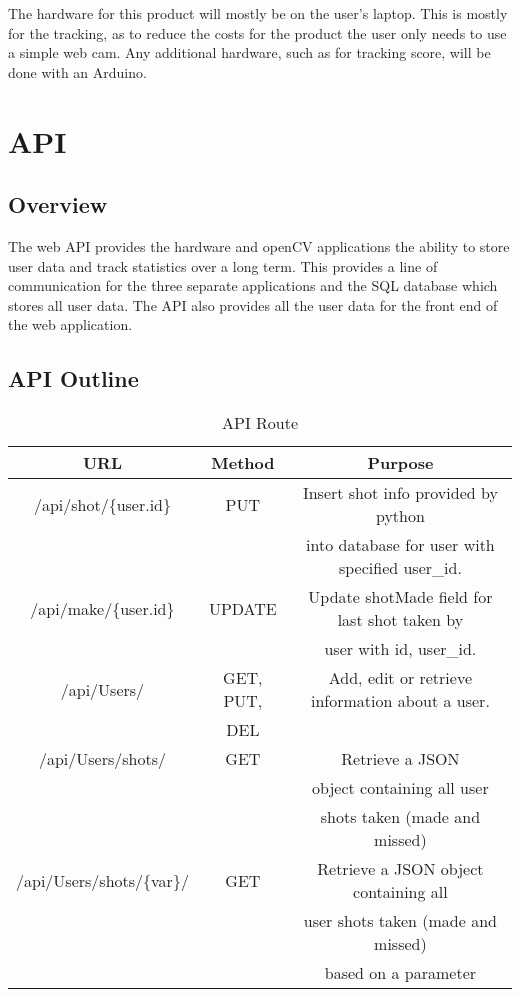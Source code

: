 The hardware for this product will mostly be on the user's laptop. This is mostly for the tracking, as to reduce the costs for the product the user only needs to use a simple web cam. Any additional hardware, such as for tracking score, will be done with an Arduino.


\section{API}
\subsection{Overview}
The web API provides the hardware and openCV applications the ability to store user data and track statistics over a long term. This provides a line of communication for the three separate applications and the SQL database which stores all user data. The API also provides all the user data for the front end of the web application.
\subsection{API Outline}
\begin{table}[h!]
  \centering
  \caption{API Route}
  \label{tab:table9}
  \begin{tabular}{ccc}
    \toprule
    URL & Method & Purpose\\
    \midrule
    /api/shot/\{user.id\} & PUT & Insert shot info provided by python \\
    & & into database for user with specified user_id. \\ 
    
    /api/make/\{user.id\} & UPDATE & Update shotMade field for last shot taken by\\ 
    & & user with id, user_id. \\
    
    /api/Users/ & GET, PUT, & Add, edit or retrieve information about a user.\\
    & DEL & \\
    
    /api/Users/shots/ & GET & Retrieve a JSON \\ 
    & & object containing all user \\
    & & shots taken (made and missed)\\
    /api/Users/shots/\{var\}/ & GET & Retrieve a JSON object containing all\\
    & & user shots taken (made and missed)\\
    & & based on a parameter\\
    \bottomrule
  \end{tabular}
\end{table}

